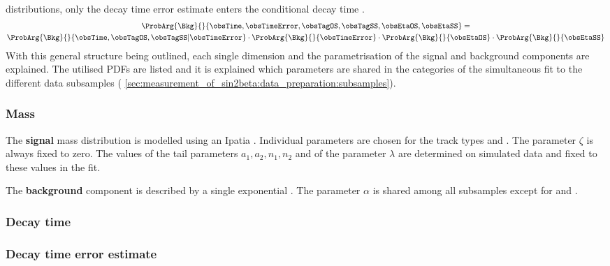distributions, only the decay time error estimate enters the conditional decay
time \PDF.
%
\begin{multline}
  \ProbArg{\Bkg}{}{\obsTime, \obsTimeError, \obsTagOS, \obsTagSS, \obsEtaOS, \obsEtaSS} = \\ 
  \ProbArg{\Bkg}{}{\obsTime, \obsTagOS, \obsTagSS \vert \obsTimeError} \cdot
  \ProbArg{\Bkg}{}{\obsTimeError} \cdot
  \ProbArg{\Bkg}{}{\obsEtaOS} \cdot
  \ProbArg{\Bkg}{}{\obsEtaSS}
\end{multline}
%
With this general structure being outlined, each single dimension and the
parametrisation of the signal and background components are explained. The
utilised \acp{PDF} are listed and it is explained which parameters are shared in
the categories of the simultaneous fit to the different data subsamples (\cf
\cref{sec:measurement_of_sin2beta:data_preparation:subsamples}).

\subsubsection{Mass}
\label{sec:measurement_of_sin2beta:likelihood_fit:model:mass}

The \textbf{signal} mass distribution is modelled using an Ipatia \PDF.
Individual parameters are chosen for the track types \catDD and \catLL. The
parameter $\zeta$ is always fixed to zero. The values of the tail parameters
$a_1, a_2, n_1, n_2$ and of the parameter $\lambda$ are determined on simulated
data and fixed to these values in the fit.

The \textbf{background} component is described by a single exponential \PDF. The
parameter $\alpha$ is shared among all subsamples except for \catDD and \catLL.

\subsubsection{Decay time}
\label{sec:measurement_of_sin2beta:likelihood_fit:model:decay_time}

\subsubsection{Decay time error estimate}
\label{sec:measurement_of_sin2beta:likelihood_fit:model:decay_time_error}

